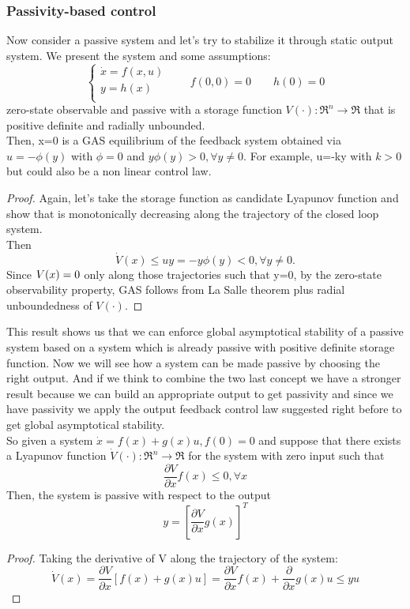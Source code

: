 \subsubsection{Passivity-based control}
Now consider a passive system and let's try to stabilize it through static output system. We present the system and some assumptions:
\[
\begin{cases}
	\dot{x}=f(x,u)\\
	y=h(x)\\
\end{cases}
\qquad f(0,0)=0\qquad h(0)=0
\]
zero-state observable and passive with a storage function $V(\cdot)\colon \Re^n\to\Re$ that is positive definite and radially unbounded.\\ Then, x=0 is a GAS equilibrium of the feedback system obtained via $u=-\phi(y)$ with $\phi=0$ and $y\phi(y)>0,\forall y \neq0$. For example, u=-ky with $k>0$ but could also be a non linear control law.
\begin{proof}
	Again, let's take the storage function as candidate Lyapunov function and show that is monotonically decreasing along the trajectory of the closed loop system. \\Then \[\dot{V}(x)\le uy = -y\phi(y)<0,\forall y\neq0.\]
	Since $\do{V}(x)=0$ only along those trajectories such that y=0, by the zero-state observability property, GAS follows from La Salle theorem plus radial unboundedness of $V(\cdot)$.
\end{proof}
This result shows us that we can enforce global asymptotical  stability of a passive system based on a system which is already passive with positive definite storage function. Now we will see how a system can be made passive by choosing the right output. And if we think to combine the two last concept we have a stronger result because we can build an appropriate output to get passivity and since we have passivity we apply the output feedback control law suggested right before to get global asymptotical stability.\\So given a system $\dot{x}=f(x)+g(x)u,f(0)=0$ and suppose that there exists a Lyapunov function $\dot{V}(\cdot)\colon\Re^n\to\Re$ for the system with zero input such that \[\frac{\partial V}{\partial x}f(x)\le 0,\forall x\] Then, the system is passive with respect to the output \[y=\left[\frac{\partial V}{\partial x}g(x)\right]^T\]
\begin{proof}
	Taking the derivative of V along the trajectory of the system: \[\dot{V}(x)=\frac{\partial V}{\partial x}[f(x)+g(x)u]=\frac{\partial V}{\partial x}f(x)+\frac{\partial}{\partial x}g(x)u\le yu\]
\end{proof}
